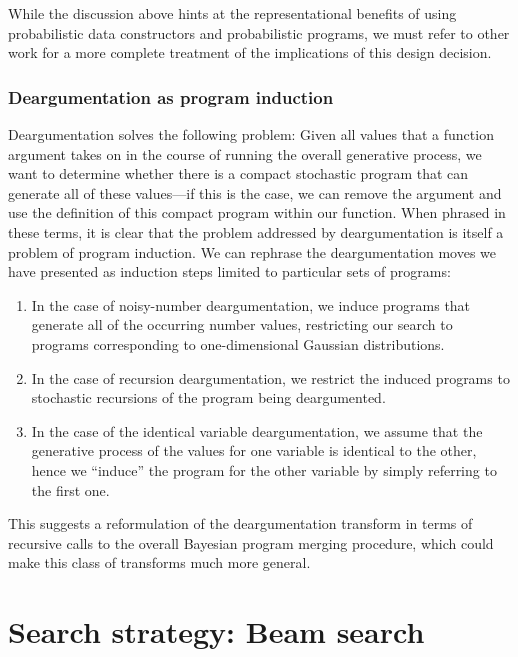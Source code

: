 \documentclass[a4paper,10pt]{article}
\begin{document}
While the discussion above hints at the representational benefits of using probabilistic data constructors and probabilistic programs, we must refer to other work for a more complete treatment of the implications of this design decision.


\subsubsection{Deargumentation as program induction}
\label{sec:dearg-as-induction}

Deargumentation solves the following problem: Given all values that a function argument takes on in the course of running the overall generative process, we want to determine whether there is a compact stochastic program that can generate all of these values---if this is the case, we can remove the argument and use the definition of this compact program within our function. When phrased in these terms, it is clear that the problem addressed by deargumentation is itself a problem of program induction. We can rephrase the deargumentation moves we have presented as induction steps limited to particular sets of programs:

\begin{enumerate}
\item In the case of noisy-number deargumentation, we induce programs that generate all of the occurring number values, restricting our search to programs corresponding to one-dimensional Gaussian distributions.
\item In the case of recursion deargumentation, we restrict the induced programs to stochastic recursions of the program being deargumented.
\item In the case of the identical variable deargumentation, we assume that the generative process of the values for one variable is identical to the other, hence we ``induce'' the program for the other variable by simply referring to the first one.
\end{enumerate}

This suggests a reformulation of the deargumentation transform in terms of recursive calls to the overall Bayesian program merging procedure, which could make this class of transforms much more general.


\newpage
\section{Search strategy: Beam search}
\end{document}

